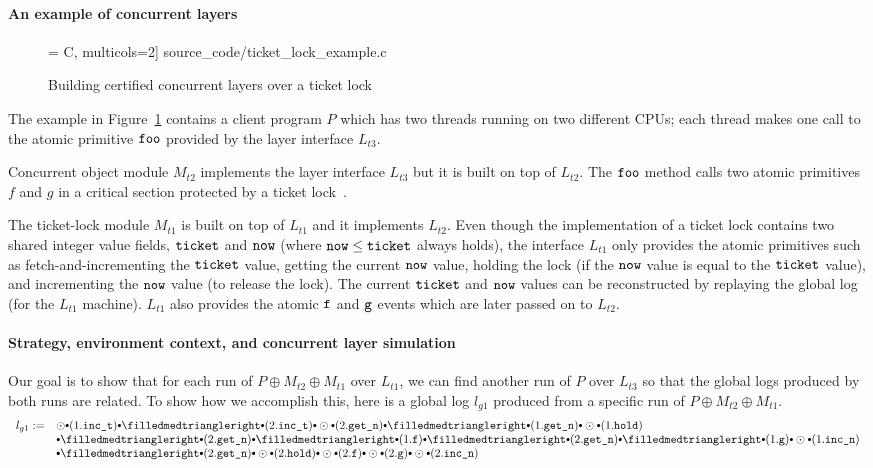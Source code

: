 \paragraph{An example of concurrent layers}
\begin{figure}[t]\centering
 = C, multicols=2] {source_code/ticket_lock_example.c}
\caption{Building certified concurrent layers over a ticket lock}
\label{fig:exp:ticket_lock_example}
\hrulefill
\end{figure}

The example in Figure~\ref{fig:exp:ticket_lock_example} contains a
client program $P$ which has two threads running on two different
CPUs; each thread makes one call to the atomic primitive ${\texttt{foo}}$
provided by the layer interface $L_{t3}$.

Concurrent object module $M_{t2}$ implements the layer interface $L_{t3}$
but it is built on top of $L_{t2}$.  The ${\texttt{foo}}$ method calls two
atomic primitives $f$ and $g$ in a critical section protected by a
ticket lock~\cite{mcs91}.

The ticket-lock module $M_{t1}$ is built on top of $L_{t1}$ and it
implements $L_{t2}$. Even though the implementation of a ticket lock
contains two shared integer value fields, ${\texttt{ticket}}$ and
${\texttt{now}}$ (where ${\texttt{now}} \leq {\texttt{ticket}}$ always holds), the
interface $L_{t1}$ only provides the atomic primitives such as
fetch-and-incrementing the ${\texttt{ticket}}$ value, getting the current
${\texttt{now}}$ value, holding the lock (if the ${\texttt{now}}$ value is
equal to the ${\texttt{ticket}}$ value), and incrementing the ${\texttt{now}}$
value (to release the lock). The current ${\texttt{ticket}}$ and
${\texttt{now}}$ values can be reconstructed by replaying the global log
(for the $L_{t1}$ machine).  $L_{t1}$ also provides the atomic ${\texttt{f}}$
and ${\texttt{g}}$ events which are later passed on to $L_{t2}$.

\paragraph{Strategy, environment context, and concurrent layer simulation}
Our goal is to show that for each run of $P\oplus{}M_{t2}\oplus{}M_{t1}$
over $L_{t1}$, we can find another run of $P$ over $L_{t3}$ so that the
global logs produced by both runs are related.
To show how we accomplish this, here is
a global log $l_{g1}$ produced from  
a specific run of $P\oplus{}M_{t2}\oplus{}M_{t1}$.
\[
\begin{array}{rl}
l_{g1}:= & \ssame \cons (1.\incticket) \cons
\sdiff \cons (2.\incticket) \cons
\ssame \cons (2.\getnow) \cons
\sdiff \cons (1.\getnow) \cons
\ssame \cons (1.\holdlock) 
\\
&\cons 
\sdiff \cons (2.\getnow) \cons
\sdiff \cons (1.\comm{f}) \cons
\sdiff \cons (2.\getnow) \cons
\sdiff \cons (1.\comm{g}) \cons
\ssame \cons (1.\incnow) 
\\
&\cons \sdiff \cons (2.\getnow) \cons
\ssame \cons (2.\holdlock) \cons
\ssame \cons (2.\comm{f}) \cons
\ssame \cons (2.\comm{g}) \cons
\ssame \cons (2.\incnow) 
\end{array}
\]

